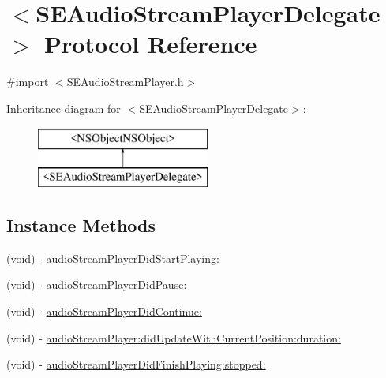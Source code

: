 \hypertarget{protocol_s_e_audio_stream_player_delegate-p}{\section{$<$S\-E\-Audio\-Stream\-Player\-Delegate$>$ Protocol Reference}
\label{protocol_s_e_audio_stream_player_delegate-p}
}


{\ttfamily \#import $<$S\-E\-Audio\-Stream\-Player.\-h$>$}

Inheritance diagram for $<$S\-E\-Audio\-Stream\-Player\-Delegate$>$\-:\begin{figure}[H]
\begin{center}
\leavevmode
\includegraphics[height=2.000000cm]{protocol_s_e_audio_stream_player_delegate-p}
\end{center}
\end{figure}
\subsection*{Instance Methods}
\begin{DoxyCompactItemize}
\item 
(void) -\/ \hyperlink{protocol_s_e_audio_stream_player_delegate-p_a74bb3b4dcd45b0c79616eba1d11fdd02}{audio\-Stream\-Player\-Did\-Start\-Playing\-:}
\item 
(void) -\/ \hyperlink{protocol_s_e_audio_stream_player_delegate-p_a11ec4e64acd6d9a5bc84a94a314c4335}{audio\-Stream\-Player\-Did\-Pause\-:}
\item 
(void) -\/ \hyperlink{protocol_s_e_audio_stream_player_delegate-p_abbf414d9214d2bae34556952792fa8bc}{audio\-Stream\-Player\-Did\-Continue\-:}
\item 
(void) -\/ \hyperlink{protocol_s_e_audio_stream_player_delegate-p_a16a6ec647062ed75001f394ae08a1125}{audio\-Stream\-Player\-:did\-Update\-With\-Current\-Position\-:duration\-:}
\item 
(void) -\/ \hyperlink{protocol_s_e_audio_stream_player_delegate-p_afd0e13575d327b091285b6c7f44792d3}{audio\-Stream\-Player\-Did\-Finish\-Playing\-:stopped\-:}
\end{DoxyCompactItemize}


